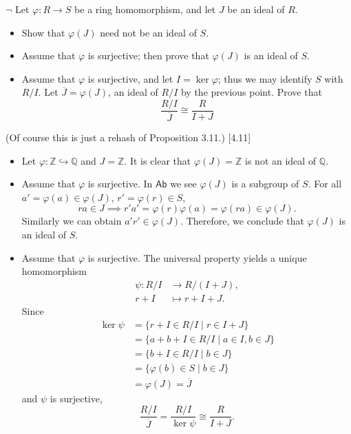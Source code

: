 \documentclass[12pt,letterpaper,boxed]{hmcpset}
\newcommand{\Ab}{\mathsf{Ab}}
\newcommand{\Q}{\mathbb{Q}}
\newcommand{\Z}{\mathbb{Z}}
\begin{document}
\hypertarget{Exercise III.3.3}{}
\begin{problem}[3.3]
$\neg$ Let $\varphi : R \to S$ be a ring homomorphism, and let $J$ be an ideal of $R$.
\begin{itemize}
	\item Show that $\varphi(J)$ need not be an ideal of $S$.
	\item Assume that $\varphi$ is surjective; then prove that $\varphi(J)$ is an ideal of $S$.
	\item Assume that $\varphi$ is surjective, and let $I = \ker\varphi$; thus we may identify $S$ with $R/I$.
	Let $\overline{J}= \varphi(J)$, an ideal of $R/I$ by the previous point. Prove that
	\[
	\frac{R / I}{\overline{J}} \cong \frac{R}{I+J}
	\]
\end{itemize}
(Of course this is just a rehash of Proposition 3.11.) [4.11]
\end{problem}
\begin{solution}
\begin{itemize}
	\item Let $\varphi:\Z\hookrightarrow \Q$ and $J=\Z$. It is clear that $\varphi(J)=\Z$ is not an ideal of $\Q$.
	\item Assume that $\varphi$ is surjective. In $\Ab$ we see $\varphi(J)$ is a subgroup of $S$. For all $a'=\varphi(a)\in\varphi(J)$, $r'=\varphi(r)\in S$,
	\[
	ra\in J\implies r'a'=\varphi(r)\varphi(a)=\varphi(ra)\in\varphi(J).
	\]
	Similarly we can obtain $a'r'\in\varphi(J)$. Therefore, we conclude that $\varphi(J)$ is an ideal of $S$.
	\item Assume that $\varphi$ is surjective. The universal property yields a unique homomorphism
	\begin{align*}
	\psi:R/I&\longrightarrow R/(I+J),\\
	r+I &\longmapsto r+I+J.
	\end{align*}
	Since
	\begin{align*}
	\ker \psi&=\{r+I\in R/I\mid r\in I+J\}\\
	&=\{a+b+I\in R/I\mid a\in I,b\in J\}\\
	&=\{b+I\in R/I\mid b\in J\}\\
	&=\{\varphi(b)\in S\mid b\in J\}\\
	&= \varphi(J)=\overline{J}
	\end{align*}
	and $\psi$ is surjective,
	\[
	\frac{R / I}{\overline{J}}=\frac{R / I}{\ker \psi} \cong \frac{R}{I+J}.
	\]
\end{itemize}
\end{solution}
\end{document}
